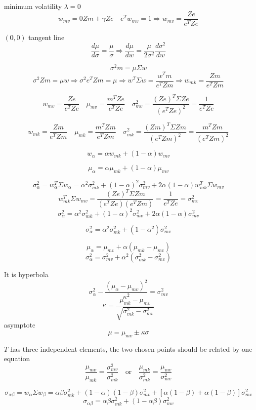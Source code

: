 \documentclass[10pt,a4paper]{article}
\begin{document}
minimum volatility $\lambda = 0$
\[
w_{mv} = 0Zm + \gamma Ze \quad e^Tw_{mv} = 1 \Rightarrow w_{mv} = \frac{Ze}{e^TZe}
\]

$(0,0)$ tangent line
\[
\frac{d\mu}{d\sigma} = \frac{\mu}{\sigma} \Rightarrow \frac{d\mu}{dw} = \frac{\mu}{2\sigma^2} \frac{d\sigma^2}{dw}
\]

\[
\sigma^2 m = \mu \Sigma w
\]
\[
\sigma^2 Zm = \mu  w \Rightarrow \sigma^2 e^TZm = \mu \Rightarrow w^T \Sigma w = \frac{w^Tm}{e^TZm} \Rightarrow w_{mk} = \frac{Zm}{e^TZm}
\]


\[
w_{mv} = \frac{Ze}{e^TZe} \quad \mu_{mv} = \frac{m^TZe}{e^TZe} \quad \sigma_{mv}^2 = \frac{(Ze)^T\Sigma Ze}{(e^TZe)^2} = \frac{1}{e^TZe}
\]

\[
 w_{mk} = \frac{Zm}{e^TZm} \quad \mu_{mk} = \frac{m^TZm}{e^TZm} \quad \sigma_{mk}^2 = \frac{(Zm)^T\Sigma Zm}{(e^TZm)^2}= \frac{m^TZm}{(e^TZm)^2}
\]

\[
w_{\alpha} = \alpha w_{mk} + (1-\alpha) w_{mv}
\]

\[
\mu_{\alpha} = \alpha \mu_{mk} + (1-\alpha) \mu_{mv}
\]

\[
\sigma^2_{\alpha} = w_{\alpha}^T \Sigma w_{\alpha} = \alpha^2 \sigma^2_{mk} + (1-\alpha)^2 \sigma^2_{mv} + 2\alpha(1-\alpha)w_{mk}^T \Sigma w_{mv}
\]
\[
w_{mk}^T \Sigma w_{mv} = \frac{(Ze)^T\Sigma Zm}{(e^TZe)(e^TZm)} = \frac{1}{e^TZe} = \sigma_{mv}^2
\]
\[
\sigma^2_{\alpha} = \alpha^2 \sigma^2_{mk} + (1-\alpha)^2 \sigma^2_{mv} + 2\alpha(1-\alpha)\sigma_{mv}^2
\]

\[
\sigma^2_{\alpha} = \alpha^2 \sigma^2_{mk} + (1-\alpha^2) \sigma^2_{mv}
\]


\[
\mu_{\alpha} =\mu_{mv} +  \alpha (\mu_{mk} - \mu_{mv}) 
\]
\[ \sigma^2_{\alpha} = \sigma^2_{mv} + \alpha^2 (\sigma^2_{mk} -\sigma^2_{mv})
\]

It is hyperbola
\[
\sigma^2_{\alpha} - \frac{(\mu_{\alpha}-\mu_{mv})^2}{\kappa^2} = \sigma^2_{mv}
\]
\[\kappa = \frac{\mu_{mk} - \mu_{mv}}{\sqrt{\sigma^2_{mk} -\sigma^2_{mv}}}
\]
asymptote 
\[
\mu = \mu_{mv} \pm \kappa\sigma
\]

$T$ has three independent elements, the two chosen points should be related by one equation
\[
\frac{\mu_{mv}}{\mu_{mk}} = \frac{\sigma^2_{mv}}{\sigma^2_{mk}} \quad \mathrm{or}  \quad \frac{\mu_{mk}}{\sigma^2_{mk}} = \frac{\mu_{mv}}{\sigma^2_{mv}}
\]


\[
\sigma_{\alpha\beta} = w_{\alpha} \Sigma w_{\beta} = \alpha\beta \sigma^2_{mk} +(1-\alpha)(1-\beta) \sigma^2_{mv} + 
[\alpha(1-\beta) + \alpha(1-\beta)]\sigma^2_{mv}
\]
\[
\sigma_{\alpha\beta} =\alpha\beta \sigma^2_{mk} + (1-\alpha\beta)\sigma^2_{mv}
\]
\end{document}
